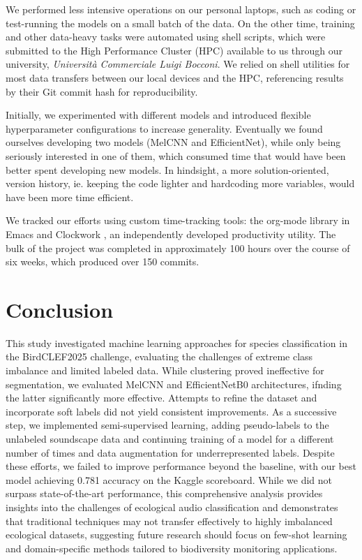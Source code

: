 \documentclass[10pt]{article}
\begin{document}
We performed less intensive operations on our personal laptops, such as coding or test-running the models on a small batch of the data. On the other time, training and other data-heavy tasks were automated using shell scripts, which were submitted to the High Performance Cluster (HPC) available to us through our university, \textit{Università Commerciale Luigi Bocconi}\cite{unibocconi}. We relied on shell utilities for most data transfers between our local devices and the HPC, referencing results by their Git commit hash for reproducibility.

Initially, we experimented with different models and introduced flexible hyperparameter configurations to increase generality. Eventually we found ourselves developing two models (MelCNN and EfficientNet), while only being seriously interested in one of them, which consumed time that would have been better spent developing new models. In hindsight, a more solution-oriented, version history, ie. keeping the code lighter and hardcoding more variables, would have been more time efficient.

We tracked our efforts using custom time-tracking tools: the org-mode library \cite{doom_emacs} in Emacs \cite{gnu_emacs} and Clockwork \cite{clockwork}, an independently developed productivity utility. The bulk of the project was completed in approximately 100 hours over the course of six weeks, which produced over 150 commits.

\section*{Conclusion}
This study investigated machine learning approaches for species classification in the BirdCLEF2025 challenge, evaluating the challenges of extreme class imbalance and limited labeled data. While clustering proved ineffective for segmentation, we evaluated MelCNN and EfficientNetB0 architectures, ifnding the latter significantly more effective. Attempts to refine the dataset and incorporate soft labels did not yield consistent improvements. As a successive step, we implemented semi-supervised learning, adding pseudo-labels to the unlabeled soundscape data and continuing training of a model for a different number of times and data augmentation for underrepresented labels. Despite these efforts, we failed to improve performance beyond the baseline, with our best model achieving 0.781 accuracy on the Kaggle scoreboard. While we did not surpass state-of-the-art performance, this comprehensive analysis provides insights into the challenges of ecological audio classification and demonstrates that traditional techniques may not transfer effectively to highly imbalanced ecological datasets, suggesting future research should focus on few-shot learning and domain-specific methods tailored to biodiversity monitoring applications.
\end{document}
